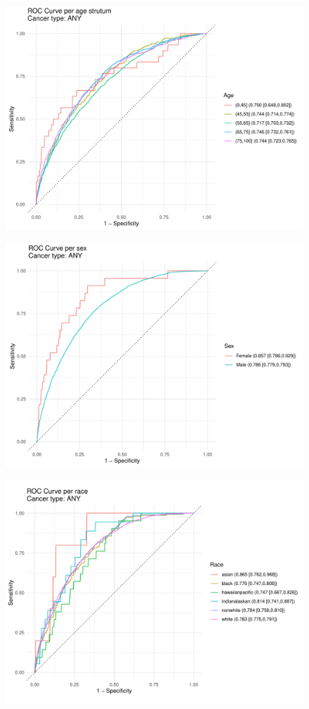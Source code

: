 \documentclass[12pt]{article}
\begin{document}
\begin{figure}[ht]
\includegraphics[width=1.0\linewidth]{identity/ANY_age.pdf}
\end{figure}
\begin{figure}[ht]
\includegraphics[width=1.0\linewidth]{identity/ANY_sex.pdf}
\end{figure}
\begin{figure}[ht]
\includegraphics[width=1.0\linewidth]{identity/ANY_race.pdf}
\end{figure}
\end{document}

